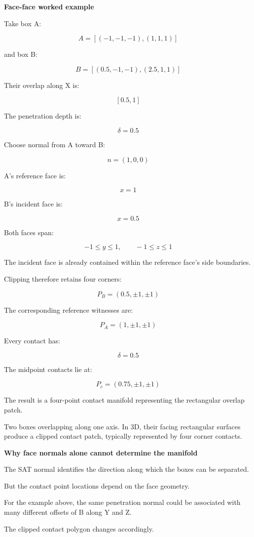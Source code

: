 \textbf{Face-face worked example}

Take box A:

\[
A=[(-1,-1,-1),(1,1,1)]
\]

and box B:

\[
B=[(0.5,-1,-1),(2.5,1,1)]
\]

Their overlap along X is:

\[
[0.5,1]
\]

The penetration depth is:

\[
\delta=0.5
\]

Choose normal from A toward B:

\[
n=(1,0,0)
\]

A's reference face is:

\[
x=1
\]

B's incident face is:

\[
x=0.5
\]

Both faces span:

\[
-1\le y\le1,\qquad-1\le z\le1
\]

The incident face is already contained within the reference face's side boundaries.

Clipping therefore retains four corners:

\[
P_B=(0.5,\pm1,\pm1)
\]

The corresponding reference witnesses are:

\[
P_A=(1,\pm1,\pm1)
\]

Every contact has:

\[
\delta=0.5
\]

The midpoint contacts lie at:

\[
\boxed{ P_c=(0.75,\pm1,\pm1) }
\]

The result is a four-point contact manifold representing the rectangular overlap patch.

Two boxes overlapping along one axis. In 3D, their facing rectangular surfaces produce a clipped contact patch, typically represented by four corner contacts.

\textbf{Why face normals alone cannot determine the manifold}

The SAT normal identifies the direction along which the boxes can be separated.

But the contact point locations depend on the face geometry.

For the example above, the same penetration normal could be associated with many different offsets of B along Y and Z.

The clipped contact polygon changes accordingly.


